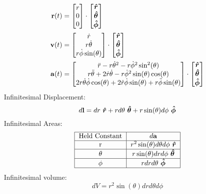     \begin{align*}
        \vb{r}(t)&=
        \begin{bmatrix}
        r
        \\
        0
        \\
        0
        \end{bmatrix}
        \cdot
        \begin{bmatrix}
        \e{r}
        \\
        \e{\theta}
        \\
        \e{\phi}
        \end{bmatrix}
        \\
        \vb{v}(t)&=
        \begin{bmatrix}
        \dot{r}
        \\
        r\dot{\theta}
        \\
        r\dot{\phi}\sin(\theta)
        \end{bmatrix}
        \cdot
        \begin{bmatrix}
        \e{r}
        \\
        \e{\theta}
        \\
        \e{\phi}
        \end{bmatrix}
        \\
        \vb{a}(t)&=
        \begin{bmatrix}
        \Ddot{r}-r\dot{\theta}^2-r\dot{\phi}^2\sin^2(\theta)
        \\
        r\Ddot{\theta}+2\dot{r}\dot{\theta}-r\dot{\phi}^2\sin(\theta)\cos(\theta)
        \\
        2r\dot{\theta}\dot{\phi}\cos(\theta)+2\dot{r}\dot{\phi}\sin(\theta)+r\Ddot{\phi}\sin(\theta)
        \end{bmatrix}
        \cdot
        \begin{bmatrix}
        \e{r}\\
        \e{\theta}\\
        \e{\phi}
        \end{bmatrix}
    \end{align*}
    \newpage\noindent
    Infinitesimal Displacement:
    \[\dl* = dr\ \e{r} + r d\theta\ \e{\theta} + r \sin(\theta) d\phi\ \e{\phi} \]
    Infinitesimal Areas:
    \begin{align*}
        \begin{tabular}{|c|c|}
            \hline
            Held Constant & $\da*$ \\ 
            \hline
            r & $r^2 \sin(\theta) d\theta d\phi\ \e{r}$\\ 
            \hline
            $\theta$ & $r \sin(\theta) dr d\phi\ \e{\theta}$ \\ 
            \hline
            $\phi$ & $r dr d\theta\ \e{\phi}$\\
            \hline
        \end{tabular}
    \end{align*}
    Infinitesimal volume: \[dV = r^2\sin(\theta) dr d\theta d\phi\]
